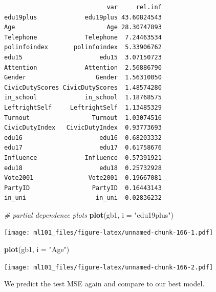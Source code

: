 \documentclass[]{article}
\newenvironment{Shaded}{\begin{snugshade}}{\end{snugshade}}
\newcommand{\CommentTok}[1]{\textcolor[rgb]{0.56,0.35,0.01}{\textit{#1}}}
\newcommand{\DataTypeTok}[1]{\textcolor[rgb]{0.13,0.29,0.53}{#1}}
\newcommand{\DecValTok}[1]{\textcolor[rgb]{0.00,0.00,0.81}{#1}}
\newcommand{\KeywordTok}[1]{\textcolor[rgb]{0.13,0.29,0.53}{\textbf{#1}}}
\newcommand{\NormalTok}[1]{#1}
\newcommand{\OperatorTok}[1]{\textcolor[rgb]{0.81,0.36,0.00}{\textbf{#1}}}
\newcommand{\StringTok}[1]{\textcolor[rgb]{0.31,0.60,0.02}{#1}}
\begin{document}
\begin{verbatim}
                            var     rel.inf
edu19plus             edu19plus 43.60824543
Age                         Age 28.30747893
Telephone             Telephone  7.24463534
polinfoindex       polinfoindex  5.33906762
edu15                     edu15  3.07150723
Attention             Attention  2.56886790
Gender                   Gender  1.56310050
CivicDutyScores CivicDutyScores  1.48574280
in_school             in_school  1.18768575
LeftrightSelf     LeftrightSelf  1.13485329
Turnout                 Turnout  1.03074516
CivicDutyIndex   CivicDutyIndex  0.93773693
edu16                     edu16  0.68203332
edu17                     edu17  0.61758676
Influence             Influence  0.57391921
edu18                     edu18  0.25732928
Vote2001               Vote2001  0.19667081
PartyID                 PartyID  0.16443143
in_uni                   in_uni  0.02836232
\end{verbatim}

\begin{Shaded}
\begin{Highlighting}[]
\CommentTok{# partial dependence plots}
\KeywordTok{plot}\NormalTok{(gb1, }\DataTypeTok{i =} \StringTok{"edu19plus"}\NormalTok{)}
\end{Highlighting}
\end{Shaded}

\texttt{[image: ml101\_files/figure-latex/unnamed-chunk-166-1.pdf]}

\begin{Shaded}
\begin{Highlighting}[]
\KeywordTok{plot}\NormalTok{(gb1, }\DataTypeTok{i =} \StringTok{"Age"}\NormalTok{)}
\end{Highlighting}
\end{Shaded}

\texttt{[image: ml101\_files/figure-latex/unnamed-chunk-166-2.pdf]}

We predict the test MSE again and compare to our best model.

\begin{Shaded}
\end{Shaded}
\end{document}
